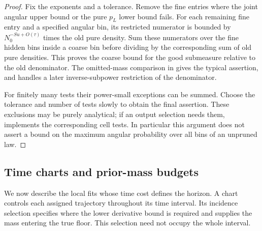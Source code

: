 \begin{proof}
Fix the exponents and a tolerance.  Remove the fine entries where
the joint angular upper bound or the pure \(p_L\) lower bound fails.
For each remaining fine entry and a specified angular bin, its
restricted numerator is bounded by
\(N_0^{-Su+O(\tau)}\) times the old pure density.
Sum these numerators over the fine hidden bins inside a coarse bin
before dividing by the corresponding sum of old pure densities.
This proves the coarse bound for the good submeasure relative to
the old denominator.  The omitted-mass comparison in
 gives the typical assertion, and
 handles a later inverse-subpower
restriction of the denominator.

For finitely many tests their power-small exceptions can be
summed.  Choose the tolerance and number of tests slowly to
obtain the final assertion.  These exclusions may be purely
analytical; if an output selection needs them,
 implements the corresponding cell tests.
In particular this argument does not assert a bound on the
maximum angular probability over all bins of an unpruned law.
\end{proof}

\subsection{Time charts and prior-mass budgets}

We now describe the local fits whose time cost defines the horizon.
A chart controls each assigned trajectory throughout its time
interval. Its incidence selection specifies where the lower
derivative bound is required and supplies the mass entering the
true floor. This selection need not occupy the whole interval.

